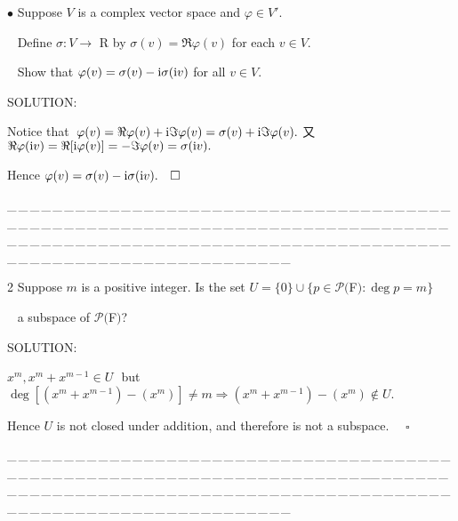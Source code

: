 \documentclass[a4paper, 11pt, UTF8]{article}
\def\i{\textup{i}}
\def\Po{\mathcal{P}}
\begin{document}
\begin{large}
{\small $\bullet$} {\timessl\Large 
Suppose $V$ is a complex vector space and $\varphi\in V'$.}\par\,\,\,
{\timessl\Large Define $σ:V\rightarrow$ {\timesbf R} by $\sigma(v) = \Re\varphi(v)$ for each $v\in V$.
}\par\,\,\,
{\timessl\Large Show that $\varphi(v)=\sigma(v)-\i\sigma(\i v)$ for all $v\in V$.
}\par
{\timesbf S\footnotesize{OLUTION:}}\par\quad
Notice that \,$\varphi(v)=\Re\varphi(v)+\i\Im\varphi(v)=\sigma(v)+\i\Im\varphi(v).$ 又 $\Re\varphi(\i v)=\Re[\i\varphi(v)]=-\Im\varphi(v)=\sigma(\i v).$\par\quad
Hence $\varphi(v)=\sigma(v)-\i\sigma(\i v).\quad\square$\par
\par
{\tiny \_\,\_\,\_\,\_\,\_\,\_\,\_\,\_\,\_\,\_\,\_\,\_\,\_\,\_\,\_\,\_\,\_\,\_\,\_\,\_\,\_\,\_\,\_\,\_\,\_\,\_\,\_\,\_\,\_\,\_\,\_\,\_\,\_\,\_\,\_\,\_\,\_\,\_\,\_\,\_\,\_\,\_\,\_\,\_\,\_\,\_\,\_\,\_\,\_\,\_\,\_\,\_\,\_\,\_\,\_\,\_\,\_\,\_\,\_\,\_\,\_\,\_\,\_\,\_\,\_\,\_\,\_\,\_\,\_\,\_\,\_\_\,\_\,\_\,\_\,\_\,\_\,\_\,\_\,\_\,\_\,\_\,\_\,\_\,\_\,\_\,\_\,\_\,\_\,\_\,\_\,\_\,\_\,\_\,\_\,\_\,\_\,\_\,\_\,\_\,\_\,\_\,\_\,\_\,\_\,\_\,\_\,\_\,\_\,\_\,\_\,\_\,\_\,\_\,\_\,\_\,\_\,\_\,\_\,\_\,\_\,\_\,\_\,\_\,\_\,\_\,\_\,\_\,\_\,\_\,\_\,\_\,\_\,\_\,\_\,\_\,\_\,\_\,\_\,\_\,\_\,\_}\par

{\timesbf\Large 2} {\timessl\Large 
Suppose $m$ is a positive integer. Is the set $U=\{0\}\cup\{p\in\Po(${\timesbf F}$):\deg p = m\}$
}\par\,\,\,
{\timessl\Large
 a subspace of $\Po(${\timesbf F}$)$?
}\par
{\timesbf S\footnotesize{OLUTION:}}\par\quad
$x^m,x^m+x^{m-1}\in U$ \,\,but\,\, $\deg[(x^m+x^{m-1})-(x^{m})]\neq m\Rightarrow (x^m+x^{m-1})-(x^{m})\not\in U.$\par\quad
Hence $U$ is not closed under addition, and therefore is not a subspace. $\quad\square$\par
{\tiny \_\,\_\,\_\,\_\,\_\,\_\,\_\,\_\,\_\,\_\,\_\,\_\,\_\,\_\,\_\,\_\,\_\,\_\,\_\,\_\,\_\,\_\,\_\,\_\,\_\,\_\,\_\,\_\,\_\,\_\,\_\,\_\,\_\,\_\,\_\,\_\,\_\,\_\,\_\,\_\,\_\,\_\,\_\,\_\,\_\,\_\,\_\,\_\,\_\,\_\,\_\,\_\,\_\,\_\,\_\,\_\,\_\,\_\,\_\,\_\,\_\,\_\,\_\,\_\,\_\,\_\,\_\,\_\,\_\,\_\,\_\_\,\_\,\_\,\_\,\_\,\_\,\_\,\_\,\_\,\_\,\_\,\_\,\_\,\_\,\_\,\_\,\_\,\_\,\_\,\_\,\_\,\_\,\_\,\_\,\_\,\_\,\_\,\_\,\_\,\_\,\_\,\_\,\_\,\_\,\_\,\_\,\_\,\_\,\_\,\_\,\_\,\_\,\_\,\_\,\_\,\_\,\_\,\_\,\_\,\_\,\_\,\_\,\_\,\_\,\_\,\_\,\_\,\_\,\_\,\_\,\_\,\_\,\_\,\_\,\_\,\_\,\_\,\_\,\_\,\_\,\_}\par


\end{large}
\end{document}
